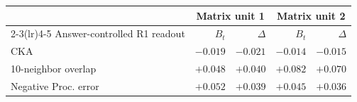 \begin{tabular}{lrrrr}
\toprule
& \multicolumn{2}{c}{Matrix unit 1} & \multicolumn{2}{c}{Matrix unit 2}\\
\cmidrule(lr){2-3}\cmidrule(lr){4-5}
Answer-controlled R1 readout & $B_t$ & $\Delta$ & $B_t$ & $\Delta$\\
\midrule
CKA & $-0.019$ & $-0.021$ & $-0.014$ & $-0.015$ \\
10-neighbor overlap & $+0.048$ & $+0.040$ & $+0.082$ & $+0.070$ \\
Negative Proc. error & $+0.052$ & $+0.039$ & $+0.045$ & $+0.036$ \\
\bottomrule
\end{tabular}
